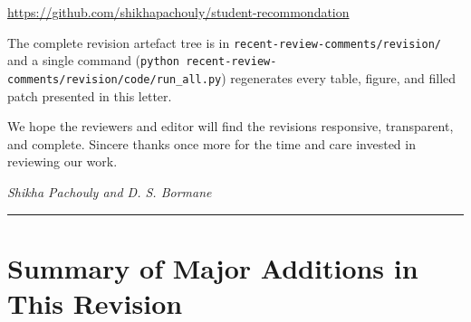\documentclass[11pt,a4paper]{article}
\newcommand{\filebox}[1]{\texttt{\small #1}}
\begin{document}
\begin{center}
  \url{https://github.com/shikhapachouly/student-recommondation}
\end{center}

\noindent The complete revision artefact tree is in \filebox{recent-review-comments/revision/} and a single command (\filebox{python recent-review-comments/revision/code/run\_all.py}) regenerates every table, figure, and filled patch presented in this letter.

\vspace{4pt}
\noindent We hope the reviewers and editor will find the revisions responsive, transparent, and complete. Sincere thanks once more for the time and care invested in reviewing our work.

\vspace{6pt}
\hfill\textit{Shikha Pachouly and D. S. Bormane}

\bigskip
\hrule
\bigskip

\section*{Summary of Major Additions in This Revision}
\end{document}

